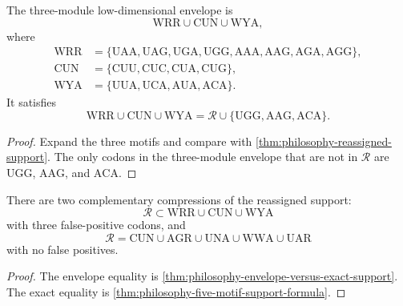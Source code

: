 \begin{theorem}
\label{thm:philosophy-envelope-versus-exact-support}
The three-module low-dimensional envelope is
$$
  \mathrm{WRR}\cup\mathrm{CUN}\cup\mathrm{WYA},
$$
where
$$
\begin{aligned}
  \mathrm{WRR}
    &=\{\mathrm{UAA},\mathrm{UAG},\mathrm{UGA},\mathrm{UGG},
       \mathrm{AAA},\mathrm{AAG},\mathrm{AGA},\mathrm{AGG}\},\\
  \mathrm{CUN}
    &=\{\mathrm{CUU},\mathrm{CUC},\mathrm{CUA},\mathrm{CUG}\},\\
  \mathrm{WYA}
    &=\{\mathrm{UUA},\mathrm{UCA},\mathrm{AUA},\mathrm{ACA}\}.
\end{aligned}
$$
It satisfies
$$
  \mathrm{WRR}\cup\mathrm{CUN}\cup\mathrm{WYA}
  =
  \mathcal{R}\cup\{\mathrm{UGG},\mathrm{AAG},\mathrm{ACA}\}.
$$
\end{theorem}
\begin{proof}
Expand the three motifs and compare with
\autoref{thm:philosophy-reassigned-support}. The only codons in the
three-module envelope that are not in $\mathcal{R}$ are
$\mathrm{UGG}$, $\mathrm{AAG}$, and $\mathrm{ACA}$.
\end{proof}

\begin{corollary}
\label{cor:philosophy-three-envelope-five-support}
There are two complementary compressions of the reassigned support:
$$
  \mathcal{R}
  \subset
  \mathrm{WRR}\cup\mathrm{CUN}\cup\mathrm{WYA}
$$
with three false-positive codons, and
$$
  \mathcal{R}
  =
  \mathrm{CUN}\cup\mathrm{AGR}\cup\mathrm{UNA}
  \cup\mathrm{WWA}\cup\mathrm{UAR}
$$
with no false positives.
\end{corollary}
\begin{proof}
The envelope equality is
\autoref{thm:philosophy-envelope-versus-exact-support}. The exact
equality is \autoref{thm:philosophy-five-motif-support-formula}.
\end{proof}

